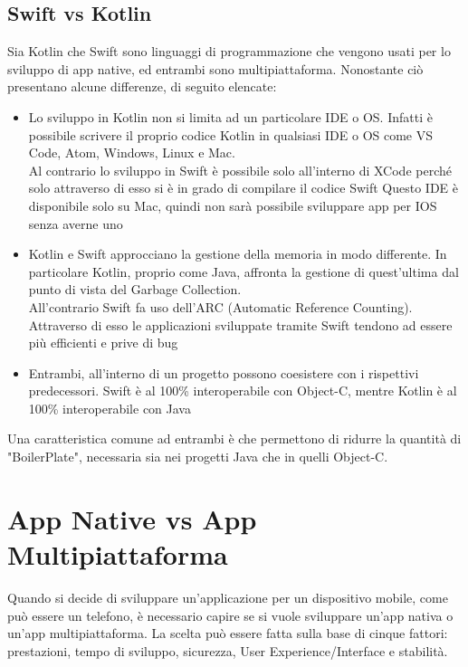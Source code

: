 \subsection{Swift vs Kotlin}
Sia Kotlin che Swift sono linguaggi di programmazione che vengono usati per lo sviluppo di app native, ed entrambi sono multipiattaforma.
Nonostante ci\`o presentano alcune differenze, di seguito elencate\cite{Swift:Kotlin}:
\begin{itemize}
      \item Lo sviluppo in Kotlin non si limita ad un particolare IDE o OS. Infatti \`e possibile scrivere il proprio codice Kotlin in qualsiasi IDE o OS come VS Code, Atom, Windows, Linux e Mac.\\
            Al contrario lo sviluppo in Swift \`e possibile solo all'interno di XCode perch\'e solo attraverso di esso si \`e in grado di compilare il codice Swift
            Questo IDE \`e disponibile solo su Mac, quindi non sar\`a possibile sviluppare app per IOS senza averne uno
      \item Kotlin e Swift approcciano la gestione della memoria in modo differente. In particolare Kotlin, proprio come Java, affronta la gestione di quest'ultima dal punto di vista del Garbage Collection.\\
            All'contrario Swift fa uso dell'ARC {}(Automatic Reference Counting). Attraverso di esso le applicazioni sviluppate tramite Swift tendono ad essere pi\`u efficienti e prive di bug
      \item Entrambi, all'interno di un progetto possono coesistere con i rispettivi predecessori. Swift \`e al 100\% interoperabile con Object-C, mentre Kotlin \`e al 100\% interoperabile con Java
\end{itemize}
Una caratteristica comune ad entrambi \`e che permettono di ridurre la quantit\`a di "BoilerPlate", necessaria sia nei progetti Java che in quelli Object-C.

\section{App Native vs App Multipiattaforma}
Quando si decide di sviluppare un'applicazione per un dispositivo mobile, come pu\`o essere un telefono, \`e necessario capire se si vuole sviluppare un'app nativa o un'app multipiattaforma.
La scelta pu\`o essere fatta sulla base di cinque fattori: prestazioni, tempo di sviluppo, sicurezza, User Experience/Interface e stabilit\`a\cite{NativeApp:MultiplatformApp}.

